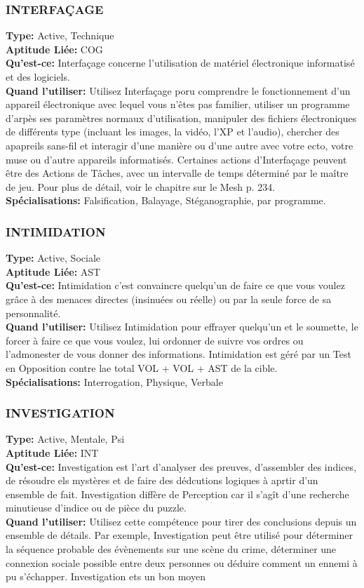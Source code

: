 \subsubsection{INTERFAÇAGE} \textbf{Type:} Active, Technique\\ \textbf{Aptitude Liée:} COG \\ \textbf{Qu'est-ce:} Interfaçage concerne l'utilisation de matériel électronique informatisé et des logiciels. \\ \textbf{Quand l'utiliser:} Utilisez Interfaçage poru comprendre le fonctionnement d'un appareil électronique avec lequel vous n'êtes pas familier, utiliser un programme d'arpès ses paramètres normaux d'utilisation, manipuler des fichiers électroniques de différents type (incluant les images, la vidéo, l'XP et l'audio), chercher des apapreils sans-fil et interagir d'une manière ou d'une autre avec votre ecto, votre muse ou d'autre appareils informatisés. Certaines actions d'Interfaçage peuvent être des Actions de Tâches, avec un intervalle de temps déterminé par le maître de jeu. Pour plus de détail, voir le chapitre sur le Mesh p. 234. \\ \textbf{Spécialisations:} Falsification, Balayage, Stéganographie, par programme. 

\subsubsection{INTIMIDATION} \textbf{Type:} Active, Sociale \\ \textbf{Aptitude Liée:} AST \\ \textbf{Qu'est-ce:} Intimidation c'est convaincre quelqu'un de faire ce que vous voulez grâce à des menaces directes (insinuées ou réelle) ou par la seule force de sa personnalité. \\ \textbf{Quand l'utiliser:} Utilisez Intimidation pour effrayer quelqu'un et le soumette, le forcer à faire ce que vous voulez, lui ordonner de suivre vos ordres ou l'admonester de vous donner des informations. Intimidation est géré par un Test en Opposition contre lae total VOL + VOL + AST de la cible. \\ \textbf{Spécialisations:} Interrogation, Physique, Verbale 

\subsubsection{INVESTIGATION} \textbf{Type:} Active, Mentale, Psi \\ \textbf{Aptitude Liée:} INT \\ \textbf{Qu'est-ce:} Investigation est l'art d'analyser des preuves, d'assembler des indices, de résoudre els mystères et de faire des dédcutions logiques à aprtir d'un ensemble de fait. Investigation diffère de Perception car il s'agît d'une recherche minutieuse d'indice ou de pièce du puzzle. \\ \textbf{Quand l'utiliser:} Utilisez cette compétence pour tirer des conclusions depuis un ensemble de détails. Par exemple, Investigation peut être utilisé pour déterminer la séquence probable des évènements sur une scène du crime, déterminer une connexion sociale possible entre deux personnes ou déduire comment un ennemi à pu s'échapper. Investigation ets un bon moyen 

